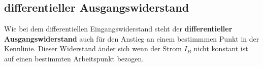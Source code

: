         \subsection{differentieller Ausgangswiderstand}
            Wie bei dem differentiellen Eingangswiderstand steht der \textbf{differentieller Ausgangswiderstand} auch für den Anstieg an einem bestimmmen Punkt in der Kennlinie.
            Dieser Widerstand änder sich wenn der Strom \(I_B\) nicht konstant ist auf einen bestimmten Arbeitspunkt bezogen.

    